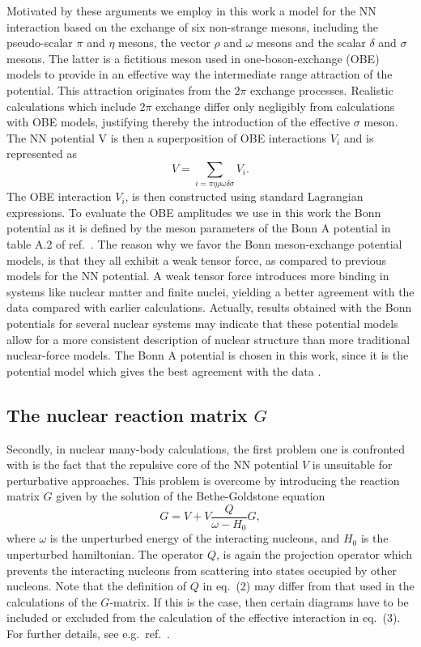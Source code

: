 Motivated by these arguments we employ in this work a model for the
NN interaction based on the exchange of six non-strange mesons, including
the pseudo-scalar $\pi$ and $\eta$ mesons, the vector $\rho$ and $\omega$
mesons and the scalar $\delta$ and $\sigma$ mesons. The latter is
a fictitious meson used in one-boson-exchange (OBE) models to provide in an
effective way the intermediate
range attraction of the potential. This attraction
originates from the $2\pi$ exchange processes.
Realistic calculations \cite{mac89}
which include $2\pi$ exchange differ only negligibly from calculations
with OBE models, justifying thereby the introduction of the effective
$\sigma$ meson.
The NN potential V is then a superposition of OBE interactions $V_i$
and is represented as
\[
V=\sum_{i=\pi\eta\rho\omega\delta\sigma}V_i.
\]
The OBE interaction $V_i$, is then constructed using
standard Lagrangian expressions.
To evaluate the OBE amplitudes we use in this work the
Bonn potential as it is defined by the meson parameters of the Bonn A potential
in table
A.2 of ref.\ \cite{mac89}. The reason why we favor the Bonn meson-exchange 
potential models, is that  they  all exhibit a weak tensor force,
as compared to previous models for the NN potential.
A weak tensor force introduces more binding in systems like nuclear matter
and finite nuclei, yielding a better agreement with the 
data compared with earlier calculations. 
Actually, results obtained with the Bonn potentials
for several nuclear systems \cite{mac89,hko94} may indicate that these potential
models allow for a more consistent description of nuclear structure than more
traditional nuclear-force models. The Bonn A potential is chosen in this
work, since it is the potential model which gives the best agreement 
with the data \cite{hko94}.


\subsection{The nuclear reaction matrix $G$}

Secondly, in nuclear many-body calculations, the first problem one is
confronted with is the fact that the repulsive core of the NN potential $V$
is unsuitable for perturbative approaches. This problem is overcome
by introducing the reaction matrix $G$ given by the solution of the
Bethe-Goldstone equation
\begin{equation}
    G=V+V\frac{Q}{\omega - H_0}G,
\end{equation}
where $\omega$ is the unperturbed energy of the interacting nucleons, 
and $H_0$ is the unperturbed hamiltonian. 
The operator $Q$, 
is again the projection operator which prevents the
interacting nucleons from scattering into states occupied by other nucleons.
Note that the definition of $Q$ in eq.\ (2) may differ from that 
used in the calculations of the $G$-matrix. If this is the case, then
certain diagrams have to be included or excluded from the calculation
of the effective interaction in eq.\ (3). For further details,
see e.g.\ ref.\ \cite{hko94}.


